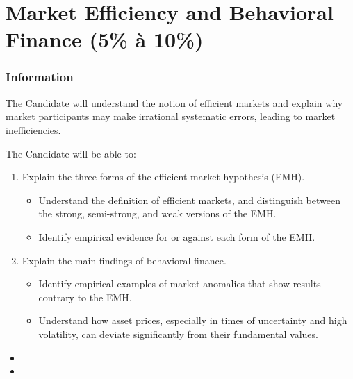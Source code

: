 \chapter[Market Efficiency and Behavioral Finance]{Market Efficiency and Behavioral Finance (5\% à 10\%)}

\subsection{Information}

\begin{distributions}[Objective]
The Candidate will understand the notion of efficient markets and explain why market participants may make irrational systematic errors, leading to market inefficiencies.
\end{distributions}

\begin{outcomes}
The Candidate will be able to:
\begin{enumerate}[label = \alph*)]
	\item	Explain the three forms of the efficient market hypothesis (EMH).
		\begin{knowledge}[]
		\begin{itemize}
		\item	Understand the definition of efficient markets, and distinguish between the strong, semi-strong, and weak versions of the EMH.
		\item	Identify empirical evidence for or against each form of the EMH.
		\end{itemize}
		\end{knowledge}
	\item	Explain the main findings of behavioral finance.
		\begin{knowledge}[]
		\begin{itemize}
		\item	Identify empirical examples of market anomalies that show results contrary to the EMH.
		\item	Understand how asset prices, especially in times of uncertainty and high volatility, can deviate significantly from their fundamental values.
		\end{itemize}
		\end{knowledge}
	\end{enumerate}
\end{outcomes}

\begin{ASM_chapter}
\begin{itemize}
	\item	{}
	\item	{}
\end{itemize}
\end{ASM_chapter}

